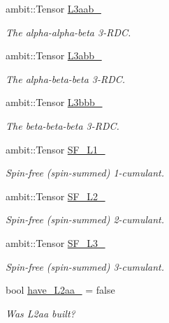 \begin{DoxyCompactItemize}
ambit\+::\+Tensor \mbox{\hyperlink{classforte_1_1_r_d_ms_a78656464d3b6a20234d08731c772a637}{L3aab\+\_\+}}
\begin{DoxyCompactList}\small\item\em The alpha-\/alpha-\/beta 3-\/\+R\+DC. \end{DoxyCompactList}\item 
ambit\+::\+Tensor \mbox{\hyperlink{classforte_1_1_r_d_ms_a052b47011c8e5e78e473b3f83455fd95}{L3abb\+\_\+}}
\begin{DoxyCompactList}\small\item\em The alpha-\/beta-\/beta 3-\/\+R\+DC. \end{DoxyCompactList}\item 
ambit\+::\+Tensor \mbox{\hyperlink{classforte_1_1_r_d_ms_a56ab5ad001107e3c1a0085a50106422a}{L3bbb\+\_\+}}
\begin{DoxyCompactList}\small\item\em The beta-\/beta-\/beta 3-\/\+R\+DC. \end{DoxyCompactList}\item 
ambit\+::\+Tensor \mbox{\hyperlink{classforte_1_1_r_d_ms_a25f2d04b6e3f62fe48eb64f45c55b562}{S\+F\+\_\+\+L1\+\_\+}}
\begin{DoxyCompactList}\small\item\em Spin-\/free (spin-\/summed) 1-\/cumulant. \end{DoxyCompactList}\item 
ambit\+::\+Tensor \mbox{\hyperlink{classforte_1_1_r_d_ms_a2c32e3a99b64898be2e0a2de9071d110}{S\+F\+\_\+\+L2\+\_\+}}
\begin{DoxyCompactList}\small\item\em Spin-\/free (spin-\/summed) 2-\/cumulant. \end{DoxyCompactList}\item 
ambit\+::\+Tensor \mbox{\hyperlink{classforte_1_1_r_d_ms_a3347391ae477f8bcd2a17960c8721e11}{S\+F\+\_\+\+L3\+\_\+}}
\begin{DoxyCompactList}\small\item\em Spin-\/free (spin-\/summed) 3-\/cumulant. \end{DoxyCompactList}\item 
bool \mbox{\hyperlink{classforte_1_1_r_d_ms_ab7c118fc7381a8847fdf46287f670255}{have\+\_\+\+L2aa\+\_\+}} = false
\begin{DoxyCompactList}\small\item\em Was L2aa built? \end{DoxyCompactList}\item 

\end{DoxyCompactItemize}
